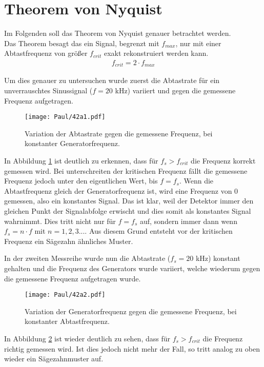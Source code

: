 \section{Theorem von Nyquist}

Im Folgenden soll das Theorem von Nyquist genauer betrachtet werden.\\
Das Theorem besagt das ein Signal, begrenzt mit $f_{max}$, nur mit einer Abtastfrequenz von größer $f_{crit}$ exakt rekonstruiert werden kann.
\begin{align}
    f_{crit} = 2 \cdot f_{max}
\end{align}


Um dies genauer zu untersuchen wurde zuerst die Abtastrate für ein unverrauschtes Sinussignal ($f = 20$ kHz) variiert und gegen die gemessene Frequenz aufgetragen.
\begin{figure}[h]
    \centering
    \texttt{[image: Paul/42a1.pdf]}
    \caption{Variation der Abtastrate gegen die gemessene Frequenz, bei konstanter Generatorfrequenz.}
    \label{fig:42a1}
\end{figure}

In Abbildung \ref{fig:42a1} ist deutlich zu erkennen, dass für $f_s > f_{crit}$ die Frequenz korrekt gemessen wird. Bei unterschreiten der kritischen Frequenz fällt die gemessene Frequenz jedoch unter den eigentlichen Wert, bis $f = f_s$. Wenn die Abtastfrequenz gleich der Generatorfrequenz ist, wird eine Frequenz von 0 gemessen, also ein konstantes Signal. Das ist klar, weil der Detektor immer den gleichen Punkt der Signalabfolge erwischt und dies somit als konstantes Signal wahrnimmt. Dies tritt nicht nur für $f = f_s$ auf, sondern immer dann wenn $f_s = n \cdot f$ mit $ n= 1,2,3...$. Aus diesem Grund entsteht vor der kritischen Frequenz ein Sägezahn ähnliches Muster.

\newpage
In der zweiten Messreihe wurde nun die Abtastrate ($f_s = 20$ kHz) konstant gehalten und die Frequenz des Generators wurde variiert, welche wiederum gegen die gemessene Frequenz aufgetragen wurde.
\begin{figure}[h]
    \centering
    \texttt{[image: Paul/42a2.pdf]}
    \caption{Variation der Generatorfrequenz gegen die gemessene Frequenz, bei konstanter Abtastfrequenz.}
    \label{fig:42a2}
\end{figure}
In Abbildung \ref{fig:42a2} ist wieder deutlich zu sehen, dass für $f_s > f_{crit}$ die Frequenz richtig gemessen wird. Ist dies jedoch nicht mehr der Fall, so tritt analog zu oben wieder ein Sägezahnmuster auf.


